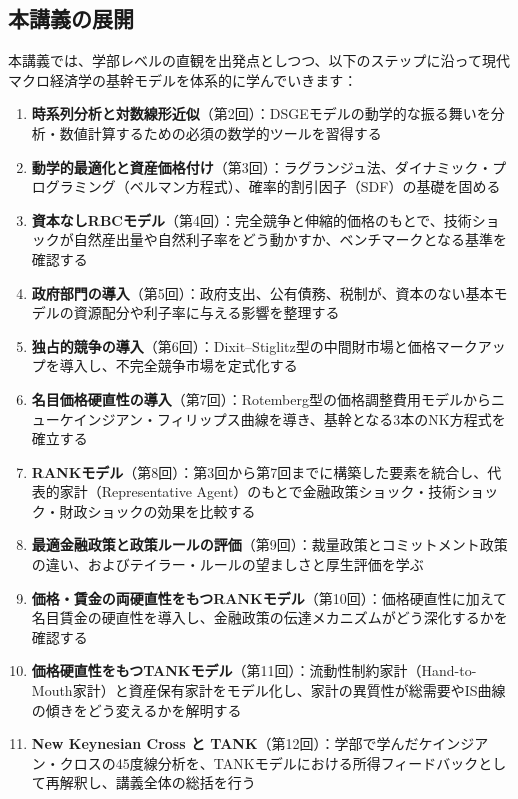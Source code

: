 \documentclass[
  japanese,
  lualatex,
  ja=standard,
  12pt,
  a4paper]{ltjsarticle}
\providecommand{\tightlist}{%
  \setlength{\itemsep}{0pt}\setlength{\parskip}{0pt}}
\begin{document}
\subsection{本講義の展開}\label{ux672cux8b1bux7fa9ux306eux5c55ux958b}

本講義では、学部レベルの直観を出発点としつつ、以下のステップに沿って現代マクロ経済学の基幹モデルを体系的に学んでいきます：

\begin{enumerate}
\def\labelenumi{\arabic{enumi}.}
\tightlist
\item
  \textbf{時系列分析と対数線形近似}（第2回）：DSGEモデルの動学的な振る舞いを分析・数値計算するための必須の数学的ツールを習得する
\item
  \textbf{動学的最適化と資産価格付け}（第3回）：ラグランジュ法、ダイナミック・プログラミング（ベルマン方程式）、確率的割引因子（SDF）の基礎を固める
\item
  \textbf{資本なしRBCモデル}（第4回）：完全競争と伸縮的価格のもとで、技術ショックが自然産出量や自然利子率をどう動かすか、ベンチマークとなる基準を確認する
\item
  \textbf{政府部門の導入}（第5回）：政府支出、公有債務、税制が、資本のない基本モデルの資源配分や利子率に与える影響を整理する
\item
  \textbf{独占的競争の導入}（第6回）：Dixit--Stiglitz型の中間財市場と価格マークアップを導入し、不完全競争市場を定式化する
\item
  \textbf{名目価格硬直性の導入}（第7回）：Rotemberg型の価格調整費用モデルからニューケインジアン・フィリップス曲線を導き、基幹となる3本のNK方程式を確立する
\item
  \textbf{RANKモデル}（第8回）：第3回から第7回までに構築した要素を統合し、代表的家計（Representative
  Agent）のもとで金融政策ショック・技術ショック・財政ショックの効果を比較する
\item
  \textbf{最適金融政策と政策ルールの評価}（第9回）：裁量政策とコミットメント政策の違い、およびテイラー・ルールの望ましさと厚生評価を学ぶ
\item
  \textbf{価格・賃金の両硬直性をもつRANKモデル}（第10回）：価格硬直性に加えて名目賃金の硬直性を導入し、金融政策の伝達メカニズムがどう深化するかを確認する
\item
  \textbf{価格硬直性をもつTANKモデル}（第11回）：流動性制約家計（Hand-to-Mouth家計）と資産保有家計をモデル化し、家計の異質性が総需要やIS曲線の傾きをどう変えるかを解明する
\item
  \textbf{New Keynesian Cross と
  TANK}（第12回）：学部で学んだケインジアン・クロスの45度線分析を、TANKモデルにおける所得フィードバックとして再解釈し、講義全体の総括を行う
\end{enumerate}
\end{document}
